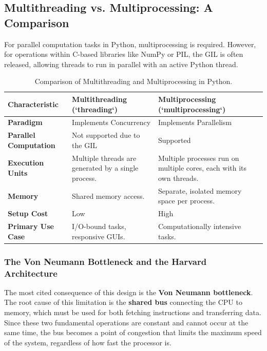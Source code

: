\subsection{Multithreading vs. Multiprocessing: A Comparison}
For parallel computation tasks in Python, multiprocessing is required. However, for operations within C-based libraries like NumPy or PIL, the GIL is often released, allowing threads to run in parallel with an active Python thread.

\begin{table}[h!]
    \centering
    \caption{Comparison of Multithreading and Multiprocessing in Python.}
    \label{tab:threading_vs_multiprocessing}
    \begin{tabular}{|l|p{}|p{}|}
        \hline
        \textbf{Characteristic} & \textbf{Multithreading (`threading`)} & \textbf{Multiprocessing (`multiprocessing`)} \\
        \hline
        \textbf{Paradigm} & Implements Concurrency & Implements Parallelism \\
        \hline
        \textbf{Parallel Computation} & Not supported due to the GIL & Supported \\
        \hline
        \textbf{Execution Units} & Multiple threads are generated by a single process. & Multiple processes run on multiple cores, each with its own threads. \\
        \hline
        \textbf{Memory} & Shared memory access. & Separate, isolated memory space per process. \\
        \hline
        \textbf{Setup Cost} & Low & High \\
        \hline
        \textbf{Primary Use Case} & I/O-bound tasks, responsive GUIs. & Computationally intensive tasks. \\
        \hline
    \end{tabular}
\end{table}

\subsubsection{The Von Neumann Bottleneck and the Harvard Architecture}
\label{Neumann_Bottleneck}
The most cited consequence of this design is the \textbf{Von Neumann bottleneck}. The root cause of this limitation is the \textbf{shared bus} connecting the CPU to memory, which must be used for both fetching instructions and transferring data. Since these two fundamental operations are constant and cannot occur at the same time, the bus becomes a point of congestion that limits the maximum speed of the system, regardless of how fast the processor is.

